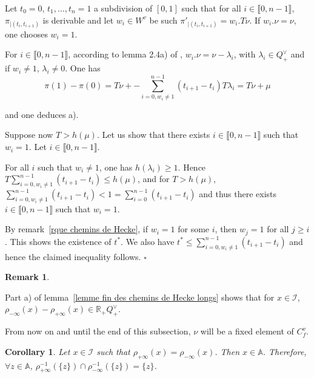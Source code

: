 \documentclass[12pt]{article}
\theoremstyle{plain}
\newtheorem{cor}[thm]{Corollary}
\theoremstyle{definition}
\newtheorem{rque}[thm]{Remark}
\begin{document}
Let $t_0=0$, $t_1, \ldots,t_n=1$ a subdivision of $[0,1]$ such that for all $i\in \llbracket 0,n-1\rrbracket $, $\pi_{|(t_i,t_{i+1})}$ is derivable and let $w_i\in W^v$ be such $\pi'_{|(t_i,t_{i+1})}=w_i.T\nu$. If $w_i.\nu=\nu$, one chooses $w_i=1$.

For $i\in \llbracket 0,n-1\rrbracket$, according to lemma 2.4a) of \cite{gaussent2014spherical}, $w_i.\nu =\nu -\lambda_i$, with $\lambda_i \in Q^\vee_+$ and if $w_i\neq 1$, $\lambda_i\neq 0$. One has \[\pi(1)-\pi(0)=T\nu+-\sum_{i=0, w_i\neq 1}^{n-1}(t_{i+1}-t_i)T\lambda_i=T\nu +\mu\]

and one deduces a).


Suppose now $T>h(\mu)$. Let us show that there exists $i\in \llbracket 0,n-1\rrbracket$ such that $w_i=1$. Let $i\in \llbracket 0,n-1\rrbracket$. 

For all $i$ such that $w_i\neq 1$, one has $h(\lambda_i)\geq 1$. Hence $T\sum_{i=0, w_i\neq 1}^{n-1}(t_{i+1}-t_i)\leq h(\mu)$, and for $T>h(\mu)$, $\sum_{i=0, w_i\neq 1}^{n-1}(t_{i+1}-t_i)<1=\sum_{i=0}^{n-1}(t_{i+1}-t_i)$ and thus there exists $i\in \llbracket 0,n-1\rrbracket$ such that $w_i=1$.

By remark~\ref{rque chemins de Hecke}, if $w_i=1$ for some $i$, then $w_j=1$ for all $j\geq i$. This shows the existence of $t^*$. We also have $t^*\leq \sum_{i=0, w_i\neq 1}^{n-1}(t_{i+1}-t_i)$ and hence the claimed inequality follows. $\square$


\begin{rque}\label{rque condition sur mu}

 Part a) of lemma~\ref{lemme fin des chemins de Hecke longs} shows that for $x\in \mathcal{I}$, $\rho_{-\infty}(x)-\rho_{+\infty}(x)\in \mathbb{R}_+Q^\vee_+$.
\end{rque}




From now on and until the end of this subsection, $\nu$ will be a fixed element of $C_f^v$.

\begin{cor}\label{cor points ayant meme image par les rétractions}
 Let $x\in\mathcal{I}$ such that $\rho_{+\infty}(x)=\rho_{-\infty}(x)$. Then $x\in \mathbb{A}$. Therefore, $\forall z\in \mathbb{A}$, $\rho_{+\infty}^{-1}(\{z\})\cap\rho_{-\infty}^{-1}(\{z\})=\{z\}$.
\end{cor}
\end{document}
